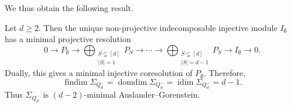 \documentclass[a4paper,leqno]{amsart}
\begin{document}
We thus obtain the following result.

\begin{cor}\label{prop:punctured-cube-injective-resolution}
Let $d\geq 2$. Then the unique non-projective indecomposable injective module $I_{\emptyset}$ has a minimal projective resolution
$$0\longrightarrow P_{\emptyset}
\longrightarrow
\bigoplus_{\substack{S\subsetneq[d]\\ |S|=1}}P_S
\longrightarrow\cdots\longrightarrow
\bigoplus_{\substack{S\subsetneq[d]\\ |S|=d-1}}P_S
\longrightarrow I_{\emptyset}
\longrightarrow0.$$
Dually, this gives a minimal injective coresolution of $P_{\emptyset}$. Therefore,
$$\operatorname{findim}\Sigma_{Q_d^{-}}=\operatorname{domdim}\Sigma_{Q_d^{-}}=\operatorname{idim}\Sigma_{Q_d^{-}}=d-1.$$
Thus $\Sigma_{Q_d^{-}}$ is $(d-2)$-minimal Auslander--Gorenstein.
\end{cor}
\end{document}

